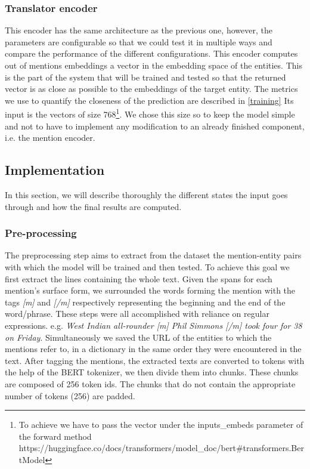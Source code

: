 \subsubsection{Translator encoder}
This encoder has the same architecture as the previous one, however, the parameters are configurable so that we could test it in multiple ways and compare the performance of the different configurations.\newline
This encoder computes out of mentions embeddings a vector in the embedding space of the entities. This is the part of the system that will be trained and tested so that the returned vector is as close as possible to the embeddings of the target entity. The metrics we use to quantify the closeness of the prediction are described in \ref{training}\newline
Its input is the vectors of size 768\footnote{To achieve we have to pass the vector under the inputs\_embeds parameter of the forward method https://huggingface.co/docs/transformers/model\_doc/bert\#transformers.BertModel}. We chose this size so to keep the model simple and not to have to implement any modification to an already finished component, i.e. the mention encoder.\newline

\subsection{Implementation}
\label{impl}

In this section, we will describe thoroughly the different states the input goes through and how the final results are computed.\newline

\subsubsection{Pre-processing}
The preprocessing step aims to extract from the dataset the mention-entity pairs with which the model will be trained and then tested. To achieve this goal we first extract the lines containing the whole text. Given the spans for each mention's surface form, we surrounded the words forming the mention with the tags \textit{[m]} and \textit{[/m]} respectively representing the beginning and the end of the word/phrase. These steps were all accomplished with reliance on regular expressions. e.g. \textit{West Indian all-rounder [m] Phil Simmons [/m] took four for 38 on Friday}.\newline
Simultaneously we saved the URL of the entities to which the mentions refer to, in a dictionary in the same order they were encountered in the text.\newline
After tagging the mentions, the extracted texts are converted to tokens with the help of the BERT tokenizer, we then divide them into chunks. These chunks are composed of 256 token ids. The chunks that do not contain the appropriate number of tokens (256) are padded.\newline

